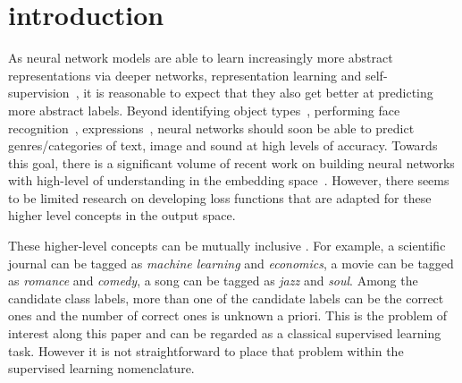 
\section{introduction}
\label{sec:org662677c}

As neural network models are able to learn increasingly more abstract representations via deeper networks, representation learning and self-supervision~\citep[see, e.g.,][]{XX,YYY,ZZZ}, it is reasonable to expect that they also get better at predicting more abstract labels. 
Beyond identifying object types~, performing face recognition~,  expressions~, neural networks should soon be able to predict genres/categories of text, image and sound at high levels of accuracy. 
Towards this goal, there is a significant volume of recent work on building neural networks with high-level of understanding in the embedding space~.
However, there seems to be limited research on developing loss functions that are adapted for these higher level concepts in the output space.


These higher-level concepts can be mutually inclusive . For example, a scientific journal can be tagged as \emph{machine learning} and \emph{economics}, a movie can be tagged as \emph{romance} and \emph{comedy}, a song can be tagged as \emph{jazz} and \emph{soul}. Among the candidate class labels, more than one of the candidate labels can be the correct ones and the number of correct ones is unknown a priori. This is the problem of interest along this paper and can be regarded as a classical supervised learning task. However it is not straightforward to place that problem within the supervised learning nomenclature.

